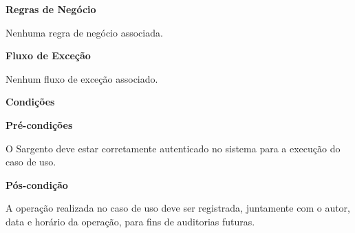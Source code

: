   
   {\raggedright
      \textbf{Regras de Negócio}
   }
   
   Nenhuma regra de negócio associada.
    
   {\raggedright
      \textbf{Fluxo de Exceção}
   }
   
   Nenhum fluxo de exceção associado.
	
   {\raggedright
      \textbf{Condições}
   }
   
    
   \textbf{Pré-condições}
   
   O Sargento deve estar corretamente autenticado no sistema para a execução do caso de uso.
   
   \textbf{Pós-condição}
   
   A operação realizada no caso de uso deve ser registrada, juntamente com o autor, data e horário da operação, para fins de auditorias futuras.

  \vfill
  \pagebreak
